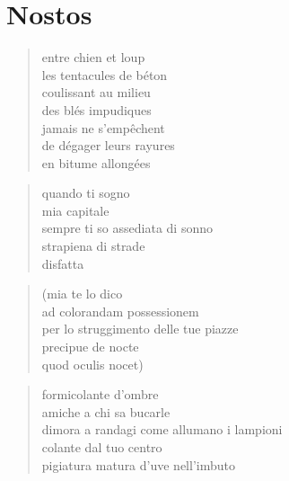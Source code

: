 \chapter*{Nostos}


\begin{otherlanguage}{french}
    \begin{verse}
        entre chien et loup\\
        les tentacules de béton\\
        coulissant au milieu\\
        des blés impudiques\\
        jamais ne s'empêchent\\
        de dégager leurs rayures\\
        en bitume allongées
    \end{verse}
\end{otherlanguage}

\clearpage


\begin{verse}
    quando ti sogno\\
    mia capitale\\
    sempre ti so assediata di sonno\\
    strapiena di strade\\
    disfatta
\end{verse}

\begin{verse}
    (mia te lo dico\\
    ad colorandam possessionem\\
    per lo struggimento delle tue piazze\\
    precipue de nocte\\
    quod oculis nocet)
\end{verse}

\begin{verse}
    formicolante d’ombre\\
    amiche a chi sa bucarle\\
    dimora a randagi come allumano i lampioni\\
    colante dal tuo centro\\
    pigiatura matura d’uve nell’imbuto
\end{verse}

\clearpage


